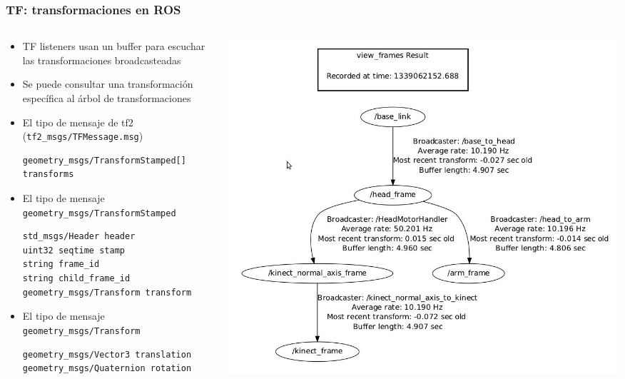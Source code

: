 \begin{frame}[fragile]
    \frametitle{TF: transformaciones en ROS}
    \scriptsize
        \begin{columns}
    	\begin{column}{0.5\textwidth}
		    \begin{itemize}
				\item TF listeners usan un buffer para escuchar las transformaciones broadcasteadas
				\item Se puede consultar una transformación específica al árbol de transformaciones
                \item El tipo de mensaje de tf2 (\lstinline[style=bash]{tf2_msgs/TFMessage.msg})
                \begin{lstlisting}[style=bash] 
geometry_msgs/TransformStamped[] transforms
                \end{lstlisting}
                \item El tipo de mensaje \lstinline[style=bash]{geometry_msgs/TransformStamped}
                \begin{lstlisting}[style=bash] 
std_msgs/Header header
uint32 seqtime stamp
string frame_id
string child_frame_id
geometry_msgs/Transform transform
                \end{lstlisting}
                \item El tipo de mensaje \lstinline[style=bash]{geometry_msgs/Transform}
                \begin{lstlisting}[style=bash] 
geometry_msgs/Vector3 translation
geometry_msgs/Quaternion rotation
                \end{lstlisting}
			\end{itemize}
    	\end{column}
    	\begin{column}{0.5\textwidth}
    		\includegraphics[width=\columnwidth]{images/tf2_tree_graph.png}
    	\end{column}
    \end{columns}
\end{frame}

